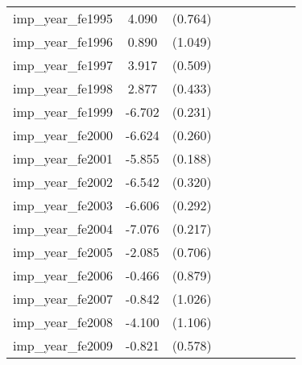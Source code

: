 {\begin{tabular}{l*{4}{cc}}
imp\_year\_fe1995&    4.090\sym{***}&  (0.764)&                  &         &                  &         &                  &         \\
imp\_year\_fe1996&    0.890         &  (1.049)&                  &         &                  &         &                  &         \\
imp\_year\_fe1997&    3.917\sym{***}&  (0.509)&                  &         &                  &         &                  &         \\
imp\_year\_fe1998&    2.877\sym{***}&  (0.433)&                  &         &                  &         &                  &         \\
imp\_year\_fe1999&   -6.702\sym{***}&  (0.231)&                  &         &                  &         &                  &         \\
imp\_year\_fe2000&   -6.624\sym{***}&  (0.260)&                  &         &                  &         &                  &         \\
imp\_year\_fe2001&   -5.855\sym{***}&  (0.188)&                  &         &                  &         &                  &         \\
imp\_year\_fe2002&   -6.542\sym{***}&  (0.320)&                  &         &                  &         &                  &         \\
imp\_year\_fe2003&   -6.606\sym{***}&  (0.292)&                  &         &                  &         &                  &         \\
imp\_year\_fe2004&   -7.076\sym{***}&  (0.217)&                  &         &                  &         &                  &         \\
imp\_year\_fe2005&   -2.085\sym{**} &  (0.706)&                  &         &                  &         &                  &         \\
imp\_year\_fe2006&   -0.466         &  (0.879)&                  &         &                  &         &                  &         \\
imp\_year\_fe2007&   -0.842         &  (1.026)&                  &         &                  &         &                  &         \\
imp\_year\_fe2008&   -4.100\sym{***}&  (1.106)&                  &         &                  &         &                  &         \\
imp\_year\_fe2009&   -0.821         &  (0.578)&                  &         &                  &         &                  &         \\

\end{tabular}}

